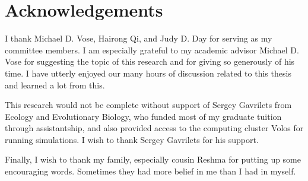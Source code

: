 \chapter*{Acknowledgements}
I thank Michael D. Vose, Hairong Qi, and Judy D. Day for serving as my committee members. 
I am especially grateful to my academic advisor Michael D. Vose for suggesting the topic of this
research and for giving so generously of his time. I have
utterly enjoyed our many hours of discussion related to this thesis 
and learned a lot from this.

This research would not be complete without support of Sergey Gavrilets 
from Ecology and Evolutionary Biology,
who funded most of my graduate tuition through assistantship, 
and also provided access to the computing cluster Volos for running simulations.
I wish to thank Sergey Gavrilets for his support. 

Finally, I wish to thank my family, 
especially cousin Reshma for putting up some encouraging words. 
Sometimes they had more belief in me than I had in myself.
